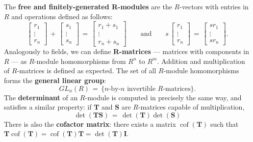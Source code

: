 \documentclass[11pt]{article}
\newcommand{\mat}[1]{\mathbf{#1}}
\newcommand{\cof}{\operatorname{cof}}
\begin{document}
The \textbf{free and finitely-generated R-modules} are the $R$-vectors with entries in $R$ and operations defined as follows:
\[
  \begin{bmatrix} r_{1} \\ \vdots \\ r_{n} \end{bmatrix} \, + \, \begin{bmatrix} s_{1} \\ \vdots \\ s_{n} \end{bmatrix} \, = \, \begin{bmatrix} r_{1} + s_{1} \\ \vdots \\ r_{n} + s_{n} \end{bmatrix} \qquad \text{and} \qquad s \, \begin{bmatrix} r_{1} \\ \vdots \\ r_{n} \end{bmatrix} \, = \, \begin{bmatrix} s r_{1} \\ \vdots \\ s r_{n} \end{bmatrix}.
\]
Analogously to fields, we can define \textbf{R-matrices} --- matrices with components in $R$ --- as $R$-module homomorphisms from $R^{n}$ to $R^{m}$. Addition and multiplication of $R$-matrices is defined as expected. The set of all $R$-module homomorphisms forms the \textbf{general linear group}:
\[
  GL_{n}(R) \, = \, \{ \text{$n$-by-$n$ invertible $R$-matrices} \}.
\]
The \textbf{determinant} of an $R$-module is computed in precisely the same way, and satisfies a similar property: if $\mat{T}$ and $\mat{S}$ are $R$-matrices capable of multiplication,
\[
  \det(\mat{TS}) \, = \, \det(\mat{T}) \det(\mat{S})
\]
There is also the \textbf{cofactor matrix}: there exists a matrix $\cof(\mat{T})$ such that $\mat{T} \cof(\mat{T}) = \cof(\mat{T}) \mat{T} = \det(\mat{T}) \mat{I}$.

\newpage
\end{document}
